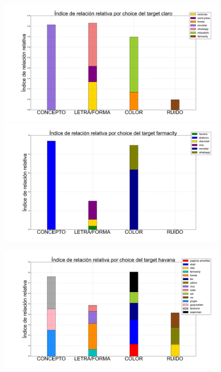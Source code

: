 \documentclass{beamer}
\begin{document}
\begin{frame}
\begin{figure}[h]
 \centering
  \begin{minipage}[c]{1\textwidth}
	\includegraphics[scale=0.108]{claro.png}
	\includegraphics[scale=0.108]{farmacity.png}
  \end{minipage}
  \begin{minipage}[c]{1\textwidth}
	\includegraphics[scale=0.108]{havana.png}
  \end{minipage}
\end{figure}
\end{frame}
\end{document}
